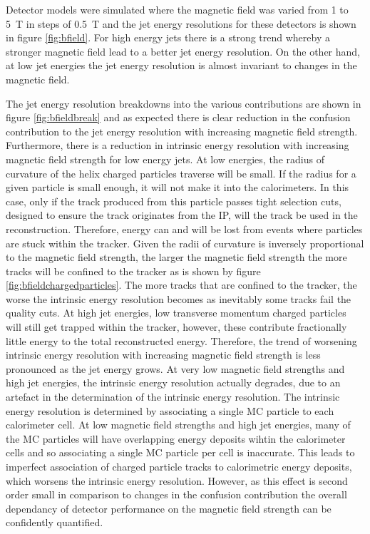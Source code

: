 Detector models were simulated where the magnetic field was varied from 1 to 5~T in steps of 0.5~T and the jet energy resolutions for these detectors is shown in figure \ref{fig:bfield}.  For high energy jets there is a strong trend whereby a stronger magnetic field lead to a better jet energy resolution.  On the other hand, at low jet energies the jet energy resolution is almost invariant to changes in the magnetic field.  

The jet energy resolution breakdowns into the various contributions are shown in figure \ref{fig:bfieldbreak} and as expected there is clear reduction in the confusion contribution to the jet energy resolution with increasing magnetic field strength.  Furthermore, there is a reduction in intrinsic energy resolution with increasing magnetic field strength for low energy jets.  At low energies, the radius of curvature of the helix charged particles traverse will be small.  If the radius for a given particle is small enough, it will not make it into the calorimeters.  In this case, only if the track produced from this particle passes tight selection cuts, designed to ensure the track originates from the IP, will the track be used in the reconstruction.  Therefore, energy can and will be lost from events where particles are stuck within the tracker.  Given the radii of curvature is inversely proportional to the magnetic field strength, the larger the magnetic field strength the more tracks will be confined to the tracker as is shown by figure \ref{fig:bfieldchargedparticles}.  The more tracks that are confined to the tracker, the worse the intrinsic energy resolution becomes as inevitably some tracks fail the quality cuts.  At high jet energies, low transverse momentum charged particles will still get trapped within the tracker, however, these contribute fractionally little energy to the total reconstructed energy.  Therefore, the trend of worsening intrinsic energy resolution with increasing magnetic field strength is less pronounced as the jet energy grows.  At very low magnetic field strengths and high jet energies, the intrinsic energy resolution actually degrades, due to an artefact in the determination of the intrinsic energy resolution.  The intrinsic energy resolution is determined by associating a single MC particle to each calorimeter cell.  At low magnetic field strengths and high jet energies, many of the MC particles will have overlapping energy deposits wihtin the calorimeter cells and so associating a single MC particle per cell is inaccurate.  This leads to imperfect association of charged particle tracks to calorimetric energy deposits, which worsens the intrinsic energy resolution.  However, as this effect is second order small in comparison to changes in the confusion contribution the overall dependancy of detector performance on the magnetic field strength can be confidently quantified.  

